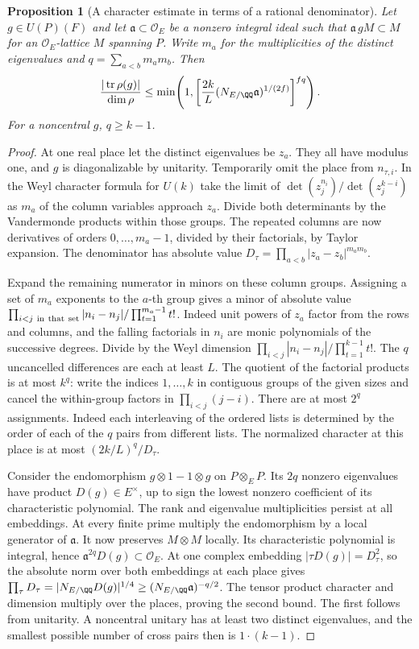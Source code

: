 \documentclass[a4paper,11pt]{article}
\newtheorem{proposition}{Proposition}[section]
\theoremstyle{definition}
\theoremstyle{remark}
\numberwithin{equation}{section}
\begin{document}
\begin{proposition}[A character estimate in terms of a rational denominator]
\leavevmode\label{prop:weyl235}
Let \(g\in U(P)(F)\) and let \(\mathfrak a\subset\mathcal O_E\)
be a nonzero integral ideal such that
\(\mathfrak a\,gM\subset M\) for an \(\mathcal O_E\)-lattice
\(M\) spanning \(P\). Write \(m_a\) for the multiplicities of
the distinct eigenvalues and \(q=\sum_{a<b}m_am_b\). Then
\[
 \frac{|\operatorname{tr}\rho(g)|}{\dim\rho}
 \le\min\!\left(1,
   \left[\frac{2k}{L}(N_{E/\QQ}\mathfrak a)^{1/(2f)}\right]^{fq}\right).
\]
For a noncentral \(g\), \(q\ge k-1\).
\end{proposition}
\begin{proof}
At one real place let the distinct eigenvalues be \(z_a\).
They all have modulus one, and \(g\) is diagonalizable by
unitarity. Temporarily omit the place from \(n_{\tau,i}\).
In the Weyl character formula for \(U(k)\) take the limit of
\(\det(z_j^{n_i})/\det(z_j^{k-i})\) as \(m_a\) of the column
variables approach \(z_a\). Divide both determinants by the
Vandermonde products within those groups. The repeated columns
are now derivatives of orders \(0,\ldots,m_a-1\), divided by
their factorials, by Taylor expansion. The denominator has
absolute value
\(D_\tau=\prod_{a<b}|z_a-z_b|^{m_am_b}\).

Expand the remaining numerator in minors on these column groups.
Assigning a set of \(m_a\) exponents to the \(a\)-th group
gives a minor of absolute value
\(\prod_{i<j\ {\rm in\ that\ set}}|n_i-n_j|/
\prod_{t=1}^{m_a-1}t!\).
Indeed unit powers of \(z_a\) factor from the rows and columns,
and the falling factorials in \(n_i\) are monic polynomials of
the successive degrees. Divide by the Weyl dimension
\(\prod_{i<j}|n_i-n_j|/\prod_{t=1}^{k-1}t!\).
The \(q\) uncancelled differences are each at least \(L\).
The quotient of the factorial products is at most \(k^q\):
write the indices \(1,\ldots,k\) in contiguous groups of the
given sizes and cancel the within-group factors in
\(\prod_{i<j}(j-i)\). There are at most \(2^q\) assignments.
Indeed each interleaving of the ordered lists is determined by
the order of each of the \(q\) pairs from different lists.
The normalized character at this place is at most
\((2k/L)^q/D_\tau\).

Consider the endomorphism \(g\otimes1-1\otimes g\) on
\(P\otimes_E P\). Its \(2q\) nonzero eigenvalues have product
\(D(g)\in E^\times\), up to sign the lowest nonzero coefficient
of its characteristic polynomial. The rank and eigenvalue
multiplicities persist at all embeddings. At every finite prime
multiply the endomorphism by a local generator of \(\mathfrak a\).
It now preserves \(M\otimes M\) locally. Its characteristic
polynomial is integral, hence \(\mathfrak a^{2q}D(g)\subset
\mathcal O_E\). At one complex embedding \(|\tau D(g)|=D_\tau^2\),
so the absolute norm over both embeddings at each place gives
\(\prod_\tau D_\tau=|N_{E/\QQ}D(g)|^{1/4}
\ge(N_{E/\QQ}\mathfrak a)^{-q/2}\). The tensor product character
and dimension multiply over the places, proving the second bound.
The first follows from unitarity. A noncentral unitary has at
least two distinct eigenvalues, and the smallest possible number
of cross pairs then is \(1\cdot(k-1)\).
\end{proof}
\end{document}
